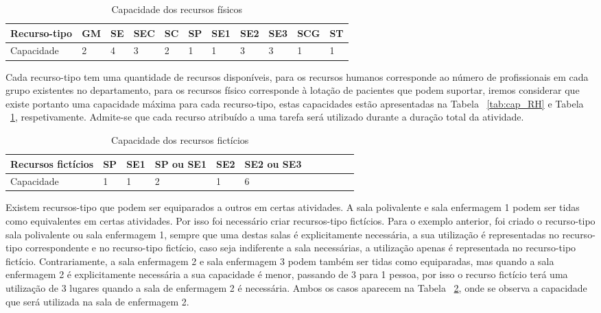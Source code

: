 \begin{table}[H]
\caption{Capacidade dos recursos físicos}
\label{tab:cap_RFis}
\begin{tabular}{lllllllllll}
\hline
Recurso-tipo & GM & SE & SEC & SC & SP & SE1 & SE2 & SE3 & SCG & ST\\ \hline
Capacidade   & 2  & 4  & 3   & 2  & 1  & 1   & 3   & 3   & 1   & 1
\end{tabular}
\end{table}

Cada recurso-tipo tem uma quantidade de recursos disponíveis, para os recursos humanos corresponde ao número de profissionais em cada grupo existentes no departamento, para os recursos físico corresponde à lotação de pacientes que podem suportar, iremos considerar que existe portanto uma capacidade máxima para cada recurso-tipo, estas capacidades estão apresentadas na Tabela ~\ref{tab:cap_RH} e Tabela ~\ref{tab:cap_RFis}, respetivamente. Admite-se que cada recurso atribuído a uma tarefa será utilizado durante a duração total da atividade.\\

\begin{table}[H]
\caption{Capacidade dos recursos fictícios}
\label{tab:cap_RFic}
\begin{tabular}{lllllllllll}
\hline
Recursos fictícios & SP & SE1 & SP ou SE1 & SE2 & SE2 ou SE3\\ \hline
Capacidade         & 1  & 1   & 2         & 1   & 6
\end{tabular}
\end{table}

Existem recursos-tipo que podem ser equiparados a outros em certas atividades. A sala polivalente e sala enfermagem 1 podem ser tidas como equivalentes em certas atividades. Por isso foi necessário criar recursos-tipo fictícios. Para o exemplo anterior, foi criado o recurso-tipo sala polivalente ou sala enfermagem 1, sempre que uma destas salas é explicitamente necessária, a sua utilização é representadas no recurso-tipo correspondente e no recurso-tipo fictício, caso seja indiferente a sala necessárias, a utilização apenas é representada no recurso-tipo fictício. Contrariamente, a sala enfermagem 2 e sala enfermagem 3 podem também ser tidas como equiparadas, mas quando a sala enfermagem 2 é explicitamente necessária a sua capacidade é menor, passando de 3 para 1 pessoa, por isso o recurso fictício terá uma utilização de 3 lugares quando a sala de enfermagem 2 é necessária. Ambos os casos aparecem na Tabela ~\ref{tab:cap_RFic}, onde se observa a capacidade que será utilizada na sala de enfermagem 2.\\


